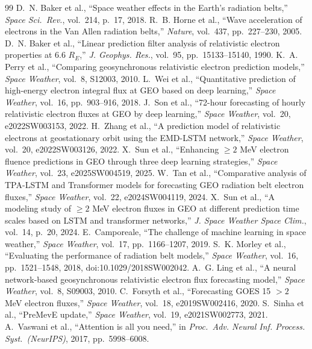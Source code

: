 \documentclass[conference]{IEEEtran}
\begin{document}
\begin{thebibliography}{99}
D.~N. Baker et al., ``Space weather effects in the Earth's radiation belts,''
\emph{Space Sci.\ Rev.}, vol.~214, p.~17, 2018.
R.~B. Horne et al., ``Wave acceleration of electrons in the Van Allen
radiation belts,'' \emph{Nature}, vol.~437, pp.~227--230, 2005.
D.~N. Baker et al., ``Linear prediction filter analysis of relativistic
electron properties at 6.6 \(R_E\),'' \emph{J. Geophys. Res.}, vol.~95,
pp.~15133--15140, 1990.
K.~A. Perry et al., ``Comparing geosynchronous relativistic electron
prediction models,'' \emph{Space Weather}, vol.~8, S12003, 2010.
L.~Wei et al., ``Quantitative prediction of high-energy electron integral flux
at GEO based on deep learning,'' \emph{Space Weather}, vol.~16,
pp.~903--916, 2018.
J.~Son et al., ``72-hour forecasting of hourly relativistic electron fluxes at
GEO by deep learning,'' \emph{Space Weather}, vol.~20, e2022SW003153, 2022.
H.~Zhang et al., ``A prediction model of relativistic electrons at
geostationary orbit using the EMD-LSTM network,''
\emph{Space Weather}, vol.~20, e2022SW003126, 2022.
X.~Sun et al., ``Enhancing \(\ge2\) MeV electron fluence predictions in GEO
through three deep learning strategies,'' \emph{Space Weather}, vol.~23,
e2025SW004519, 2025.
W.~Tan et al., ``Comparative analysis of TPA-LSTM and Transformer models
for forecasting GEO radiation belt electron fluxes,'' \emph{Space Weather}, vol.~22, e2024SW004119, 2024.
X.~Sun et al., ``A modeling study of \(\ge2\) MeV electron fluxes in GEO at
different prediction time scales based on LSTM and transformer networks,'' \emph{J. Space Weather Space Clim.},
vol.~14, p.~20, 2024.
E.~Camporeale, ``The challenge of machine learning in space weather,''
\emph{Space Weather}, vol.~17, pp.~1166--1207, 2019.
S.~K. Morley et al., ``Evaluating the performance of radiation belt models,''
\emph{Space Weather}, vol.~16, pp.~1521--1548, 2018, doi:10.1029/2018SW002042.
A.~G. Ling et al., ``A neural network-based geosynchronous relativistic electron flux forecasting model,'' \emph{Space Weather}, vol.~8, S09003, 2010.
C.~Forsyth et al., ``Forecasting GOES 15 \(>2\) MeV electron fluxes,''
\emph{Space Weather}, vol.~18, e2019SW002416, 2020.
S.~Sinha et al., ``PreMevE update,'' \emph{Space Weather}, vol.~19,
e2021SW002773, 2021.
A.~Vaswani et al., ``Attention is all you need,'' in \emph{Proc.\ Adv. Neural Inf. Process. Syst.\ (NeurIPS)}, 2017,
pp.~5998--6008.
\end{thebibliography}
\end{document}
